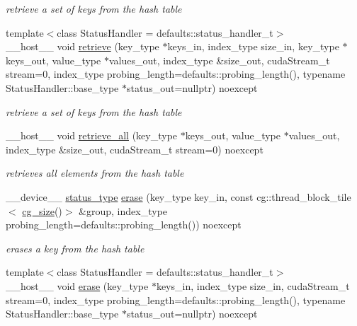 \begin{DoxyCompactItemize}
\begin{DoxyCompactList}\small\item\em retrieve a set of keys from the hash table \end{DoxyCompactList}\item 
{\footnotesize template$<$class Status\+Handler  = defaults\+::status\+\_\+handler\+\_\+t$>$ }\\\+\_\+\+\_\+host\+\_\+\+\_\+ void \hyperlink{classwarpcore_1_1SingleValueHashTable_a05e09d4603ea74d98694c52d8cf8b1ed}{retrieve} (key\+\_\+type $\ast$keys\+\_\+in, index\+\_\+type size\+\_\+in, key\+\_\+type $\ast$keys\+\_\+out, value\+\_\+type $\ast$values\+\_\+out, index\+\_\+type \&size\+\_\+out, cuda\+Stream\+\_\+t stream=0, index\+\_\+type probing\+\_\+length=defaults\+::probing\+\_\+length(), typename Status\+Handler\+::base\+\_\+type $\ast$status\+\_\+out=nullptr) noexcept
\begin{DoxyCompactList}\small\item\em retrieve a set of keys from the hash table \end{DoxyCompactList}\item 
\+\_\+\+\_\+host\+\_\+\+\_\+ void \hyperlink{classwarpcore_1_1SingleValueHashTable_a644ea0d0a251923b1c60e2189bcdd504}{retrieve\+\_\+all} (key\+\_\+type $\ast$keys\+\_\+out, value\+\_\+type $\ast$values\+\_\+out, index\+\_\+type \&size\+\_\+out, cuda\+Stream\+\_\+t stream=0) noexcept
\begin{DoxyCompactList}\small\item\em retrieves all elements from the hash table \end{DoxyCompactList}\item 
\+\_\+\+\_\+device\+\_\+\+\_\+ \hyperlink{classwarpcore_1_1Status}{status\+\_\+type} \hyperlink{classwarpcore_1_1SingleValueHashTable_a93e05fcb58ea20f8e0f12c7ce923bf35}{erase} (key\+\_\+type key\+\_\+in, const cg\+::thread\+\_\+block\+\_\+tile$<$ \hyperlink{classwarpcore_1_1SingleValueHashTable_aaa4cf7e3252a0b177101fca437e5309e}{cg\+\_\+size}()$>$ \&group, index\+\_\+type probing\+\_\+length=defaults\+::probing\+\_\+length()) noexcept
\begin{DoxyCompactList}\small\item\em erases a key from the hash table \end{DoxyCompactList}\item 
{\footnotesize template$<$class Status\+Handler  = defaults\+::status\+\_\+handler\+\_\+t$>$ }\\\+\_\+\+\_\+host\+\_\+\+\_\+ void \hyperlink{classwarpcore_1_1SingleValueHashTable_a6cfb455673cf983883cf118e04170ced}{erase} (key\+\_\+type $\ast$keys\+\_\+in, index\+\_\+type size\+\_\+in, cuda\+Stream\+\_\+t stream=0, index\+\_\+type probing\+\_\+length=defaults\+::probing\+\_\+length(), typename Status\+Handler\+::base\+\_\+type $\ast$status\+\_\+out=nullptr) noexcept

\end{DoxyCompactItemize}
